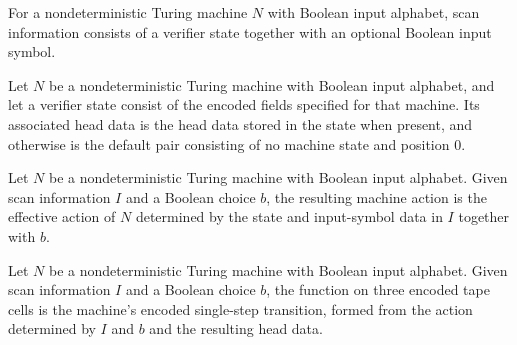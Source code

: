 \begin{definition}
\label{Complexity.Codec.SInfo}
\leanok
{}
For a nondeterministic Turing machine $N$ with Boolean input alphabet, scan information
consists of a verifier state together with an optional Boolean input symbol.
\end{definition}

\begin{definition}
\label{Complexity.Codec.hdOfV}
\leanok
{}
Let $N$ be a nondeterministic Turing machine with Boolean input alphabet, and let a
verifier state consist of the encoded fields specified for that machine. Its associated
head data is the head data stored in the state when present, and otherwise is the
default pair consisting of no machine state and position $0$.
\end{definition}

\begin{definition}
\label{Complexity.Codec.aI}
\leanok
{}
Let $N$ be a nondeterministic Turing machine with Boolean input alphabet. Given scan
information $I$ and a Boolean choice $b$, the resulting machine action is the effective
action of $N$ determined by the state and input-symbol data in $I$ together with $b$.
\end{definition}

\begin{definition}
\label{Complexity.Codec.Gs}
\leanok
{}
Let $N$ be a nondeterministic Turing machine with Boolean input alphabet. Given scan
information $I$ and a Boolean choice $b$, the function on three encoded tape cells is
the machine's encoded single-step transition, formed from the action determined by $I$
and $b$ and the resulting head data.
\end{definition}

